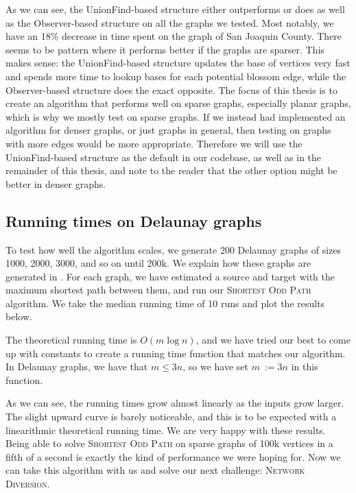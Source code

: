 As we can see, the UnionFind-based structure either outperforms or does as well as the Observer-based structure on all the graphs we tested. Most notably, we have an 18\% decrease in time spent on the graph of San Joaquin County. There seems to be pattern where it performs better if the graphs are sparser. This makes sense: the UnionFind-based structure updates the base of vertices very fast and spends more time to lookup bases for each potential blossom edge, while the Observer-based structure does the exact opposite. The focus of this thesis is to create an algorithm that performs well on sparse graphs, especially planar graphs, which is why we mostly test on sparse graphs. If we instead had implemented an algorithm for denser graphs, or just graphs in general, then testing on graphs with more edges would be more appropriate. Therefore we will use the UnionFind-based structure as the default in our codebase, as well as in the remainder of this thesis, and note to the reader that the other option might be better in denser graphs.

\subsection{Running times on Delaunay graphs}
\label{subsubsection:odd-path-delaunay-testing}
To test how well the algorithm scales, we generate 200 Delaunay graphs of sizes 1000, 2000, 3000, and so on until 200k. We explain how these graphs are generated in . For each graph, we have estimated a source and target with the maximum shortest path between them, and run our \textsc{Shortest Odd Path} algorithm. We take the median running time of 10 runs and plot the results below.

The theoretical running time is $O(m \log n)$, and we have tried our best to come up with constants to create a running time function that matches our algorithm. In Delaunay graphs, we have that $m \leq 3n$, so we have set $m~:= 3n$ in this function.

\begin{center}
    
\end{center}

As we can see, the running times grow almost linearly as the inputs grow larger. The slight upward curve is barely noticeable, and this is to be expected with a linearithmic theoretical running time. We are very happy with these results. Being able to solve \textsc{Shortest Odd Path} on sparse graphs of 100k vertices in a fifth of a second is exactly the kind of performance we were hoping for. Now we can take this algorithm with us and solve our next challenge: \textsc{Network Diversion}.
